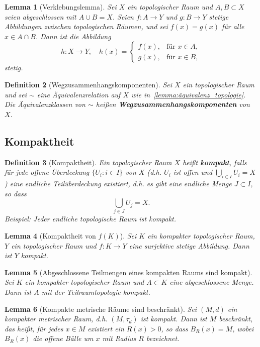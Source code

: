 \documentclass[a4paper,12pt]{article}
\theoremstyle{break}
\newtheorem{definition}{Definition}[section]
\newtheorem{lemma}[definition]{Lemma}
\begin{document}
\begin{lemma}[Verklebungslemma]
Sei $X$ ein topologischer Raum und $A, B \subset X$ seien abgeschlossen mit $A \cup B = X$. Seien $f : A \to Y$ und $g : B \to Y$ stetige Abbildungen zwischen topologischen Räumen, und sei $f(x) = g(x)$ für alle $x \in A \cap B$. Dann ist die Abbildung
\[
h : X \to Y, \quad h(x) = 
\begin{cases} 
f(x), & \text{für } x \in A, \\
g(x), & \text{für } x \in B,
\end{cases}
\]
stetig.
\end{lemma}

\begin{definition}[Wegzusammenhangskomponenten]
Sei $X$ ein topologischer Raum und sei $\sim$ eine Äquivalenzrelation auf $X$ wie in~\ref{lemma:äquivalenz_topologie}. Die Äquivalenzklassen von $\sim$ heißen \textbf{Wegzusammenhangskomponenten} von $X$.
\end{definition}

\subsection{Kompaktheit}

\begin{definition}[Kompaktheit]
Ein topologischer Raum $X$ heißt \textbf{kompakt}, falls für jede offene Überdeckung $\{U_i : i \in I\}$ von $X$ (d.h. $U_i$ ist offen und $\bigcup_{i \in I} U_i = X$) eine endliche Teilüberdeckung existiert, d.h. es gibt eine endliche Menge $J \subset I$, so dass
\[
\bigcup_{j \in J} U_j = X.
\]
Beispiel: Jeder endliche topologische Raum ist kompakt.
\end{definition}

\begin{lemma}[Kompaktheit von $f(K)$]
Sei $K$ ein kompakter topologischer Raum, $Y$ ein topologischer Raum und $f : K \to Y$ eine surjektive stetige Abbildung. Dann ist $Y$ kompakt.
\end{lemma}

\begin{lemma}[Abgeschlossene Teilmengen eines kompakten Raums sind kompakt]
Sei $K$ ein kompakter topologischer Raum und $A \subset K$ eine abgeschlossene Menge. Dann ist $A$ mit der Teilraumtopologie kompakt.
\end{lemma}

\begin{lemma}[Kompakte metrische Räume sind beschränkt]
Sei $(M, d)$ ein kompakter metrischer Raum, d.h. $(M, \tau_d)$ ist kompakt. Dann ist $M$ beschränkt, das heißt, für jedes $x \in M$ existiert ein $R(x) > 0$, so dass $B_R(x) = M$, wobei $B_R(x)$ die offene Bälle um $x$ mit Radius $R$ bezeichnet.
\end{lemma}
\end{document}
